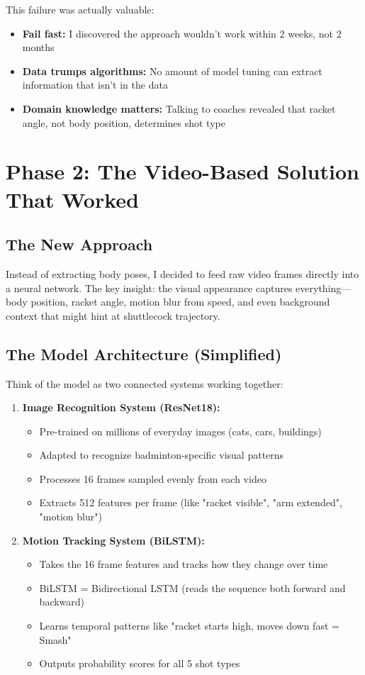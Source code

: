 \documentclass[11pt,a4paper]{article}
\begin{document}
This failure was actually valuable:
\begin{itemize}
\item \textbf{Fail fast:} I discovered the approach wouldn't work within 2 weeks, not 2 months
\item \textbf{Data trumps algorithms:} No amount of model tuning can extract information that isn't in the data
\item \textbf{Domain knowledge matters:} Talking to coaches revealed that racket angle, not body position, determines shot type
\end{itemize}

\section{Phase 2: The Video-Based Solution That Worked}

\subsection{The New Approach}

Instead of extracting body poses, I decided to feed raw video frames directly into a neural network. The key insight: the visual appearance captures everything---body position, racket angle, motion blur from speed, and even background context that might hint at shuttlecock trajectory.

\subsection{The Model Architecture (Simplified)}

Think of the model as two connected systems working together:

\begin{enumerate}
\item \textbf{Image Recognition System (ResNet18):}
  \begin{itemize}
  \item Pre-trained on millions of everyday images (cats, cars, buildings)
  \item Adapted to recognize badminton-specific visual patterns
  \item Processes 16 frames sampled evenly from each video
  \item Extracts 512 features per frame (like "racket visible", "arm extended", "motion blur")
  \end{itemize}

\item \textbf{Motion Tracking System (BiLSTM):}
  \begin{itemize}
  \item Takes the 16 frame features and tracks how they change over time
  \item BiLSTM = Bidirectional LSTM (reads the sequence both forward and backward)
  \item Learns temporal patterns like "racket starts high, moves down fast = Smash"
  \item Outputs probability scores for all 5 shot types
  \end{itemize}
\end{enumerate}
\end{document}
